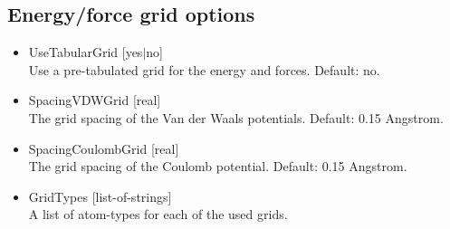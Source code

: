\subsection*{Energy/force grid options}
\begin{itemize}
\item{UseTabularGrid [yes$|$no]}\\
Use a pre-tabulated grid for the energy and forces. Default: no.
\item{SpacingVDWGrid [real]}\\
The grid spacing of the Van der Waals potentials. Default: 0.15 Angstrom.
\item{SpacingCoulombGrid [real]}\\
The grid spacing of the Coulomb potential. Default: 0.15 Angstrom.
\item{GridTypes [list-of-strings]}\\
A list of atom-types for each of the used grids.
\end{itemize}

